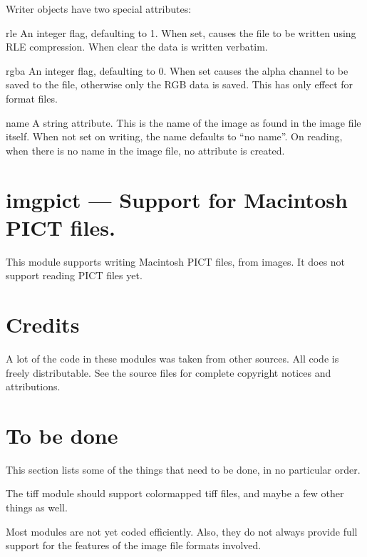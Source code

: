 Writer objects have two special attributes:

\begin{memberdesc}[imgsgiwriter]{rle}
An integer flag, defaulting to 1. When set, causes the file to be
written using RLE compression. When clear the data is written verbatim.
\end{memberdesc}

\begin{memberdesc}[imgsgiwriter]{rgba}
An integer flag, defaulting to 0. When set causes the alpha channel to
be saved to the file, otherwise only the RGB data is saved.  This has
only effect for  format files.
\end{memberdesc}

\begin{memberdesc}[imsgsgiobject]{name}
A string attribute.  This is the name of the image as found in the
image file itself.  When not set on writing, the name defaults to ``no
name''.  On reading, when there is no name in the image file, no
 attribute is created.
\end{memberdesc}

\section{imgpict ---
	Support for Macintosh PICT files.}
This module supports writing Macintosh PICT files, from 
images. It does not support reading PICT files yet.

\section{Credits}
A lot of the code in these modules was taken from other sources. All
code is freely distributable. See the source files for complete
copyright notices and attributions.

\section{To be done}
This section lists some of the things that need to be done, in no
particular order.

The tiff module should support colormapped tiff files, and maybe a few
other things as well.

Most modules are not yet coded efficiently. Also, they do not always
provide full support for the features of the image file formats
involved.
